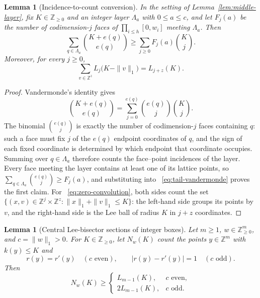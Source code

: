 \documentclass[pdflatex,sn-mathphys-num]{sn-jnl}
\theoremstyle{thmstyleone}
\newtheorem{lemma}[theorem]{Lemma}
\theoremstyle{thmstylethree}
\theoremstyle{thmstyletwo}
\newcommand{\Z}{\mathbb Z}
\begin{document}
\begin{lemma}[Incidence-to-count conversion]
\label{lem:incidence-count}
In the setting of Lemma~\ref{lem:middle-layer}, fix $K\in\Z_{\ge0}$ and an
integer layer $\Lambda_a$ with $0\le a\le c$, and let $F_j(a)$ be the number
of codimension-$j$ faces of $\prod_{i\le h}[0,w_i]$ meeting $\Lambda_a$.
Then
\[
 \sum_{q\in\Lambda_a}\binom{K+e(q)}{e(q)}
 \ge\sum_{j\ge0}F_j(a)\binom Kj.
\]
Moreover, for every $j\ge0$,
\begin{equation}
 \sum_{v\in\Z^z}L_j\bigl(K-\|v\|_1\bigr)=L_{j+z}(K). \label{eq:zero-convolution}
\end{equation}
\end{lemma}

\begin{proof}
Vandermonde's identity gives
\begin{equation}
 \binom{K+e(q)}{e(q)}
 =\sum_{j=0}^{e(q)}\binom{e(q)}j\binom Kj.             \label{eq:tail-vandermonde}
\end{equation}
The binomial $\binom{e(q)}j$ is exactly the number of codimension-$j$ faces
containing $q$: such a face must fix $j$ of the $e(q)$ endpoint coordinates
of $q$, and the sign of each fixed coordinate is determined by which
endpoint that coordinate occupies.  Summing over $q\in\Lambda_a$ therefore
counts the face--point incidences of the layer.  Every face meeting the
layer contains at least one of its lattice points, so
$\sum_{q\in\Lambda_a}\binom{e(q)}j\ge F_j(a)$, and substituting into
~\eqref{eq:tail-vandermonde} proves the first claim.  For
~\eqref{eq:zero-convolution}, both sides count the set
$\{(x,v)\in\Z^j\times\Z^z:\|x\|_1+\|v\|_1\le K\}$: the left-hand side groups
its points by $v$, and the right-hand side is the Lee ball of radius $K$ in
$j+z$ coordinates.
\end{proof}

\begin{lemma}[Central Lee-bisector sections of integer boxes]
\label{lem:central-box}
Let $m\ge1$, $w\in\Z_{\ge0}^m$, and $c=\|w\|_1>0$.  For $K\in\Z_{\ge0}$, let
$N_w(K)$ count the points $y\in\Z^m$ with $k(y)\le K$ and
\[
 r(y)=r'(y)\quad(c\text{ even}),
 \qquad |r(y)-r'(y)|=1\quad(c\text{ odd}).
\]
Then
\begin{equation}
 N_w(K)\ge
 \begin{cases}
  L_{m-1}(K),&c\text{ even},\\
  2L_{m-1}(K),&c\text{ odd}.
 \end{cases}                                           \label{eq:central-box-bound}
\end{equation}
\end{lemma}
\end{document}
